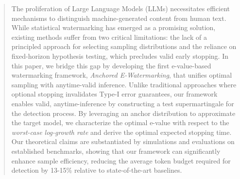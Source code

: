 \documentclass[12pt]{article}
\theoremstyle{plain}
\theoremstyle{definition}
\theoremstyle{plain}
\theoremstyle{plain}
\begin{document}
\begin{abstract}
The proliferation of Large Language Models (LLMs) necessitates efficient mechanisms to distinguish machine-generated content from human text. While statistical watermarking has emerged as a promising solution, existing methods suffer from two critical limitations: the lack of a principled approach for selecting sampling distributions and the reliance on fixed-horizon hypothesis testing, which precludes valid early stopping. In this paper, we bridge this gap by developing the first e-value-based watermarking framework, \emph{Anchored E-Watermarking}, that unifies optimal sampling with anytime-valid inference. Unlike traditional approaches where optional stopping invalidates Type-I error guarantees, our framework enables valid, anytime-inference by constructing a test supermartingale for the detection process. By leveraging an anchor distribution to approximate the target model, we characterize the optimal e-value with respect to the \emph{worst-case log-growth rate} and derive the optimal expected stopping time. Our theoretical claims are substantiated by simulations and evaluations on established benchmarks, showing that our framework can significantly enhance sample efficiency, reducing the average token budget required for detection by 13-15\% relative to state-of-the-art baselines.
\end{abstract}









\ifdefined\isarxiv


\newpage
\appendix
\else





\onecolumn

\fi


\newpage
\appendix





\end{document}
